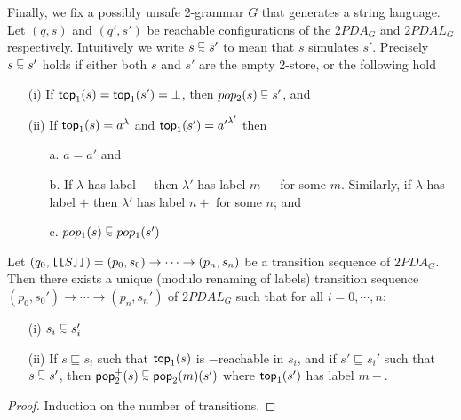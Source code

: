 Finally, we fix a possibly unsafe 2-grammar $G$ that generates a
string language. Let $(q, s)$ and $(q', s')$ be reachable
configurations of the $2PDA_G$ and $2PDAL_G$ respectively.
Intuitively we write $s \bohm s'$ to mean that $s$ simulates $s'$.
Precisely $s \bohm s'$ holds if either both $s$ and $s'$ are the
empty 2-store, or the following hold
\begin{itemize}
\item[(i)] If ${\sf top}_1(s) = {\sf top}_1(s') = \bot$, then $pop_2(s)
\bohm s'$, and
\item[(ii)] If ${\sf top}_1(s) = {a}^{\lambda}$ and ${\sf top}_1(s') =
{a'}^{\lambda'}$ then 
\begin{itemize}
\item[a.] $a = a'$ and
\item[b.] If $\lambda$ has label $-$ then $\lambda'$ has label $m-$
for some $m$. Similarly, if $\lambda$ has label $+$ then $\lambda'$
has label $n+$ for some $n$; and


\item[c.] $pop_1(s) \bohm pop_1(s')$
\end{itemize}
\end{itemize}

\begin{lemma}\label{lem:consistency}
Let $(q_0, \hbox{\tt [}{\hbox{\tt [}{S}\hbox{\tt ]}}\hbox{\tt ]}) = (p_0, s_0) \rightarrow \cdots
\rightarrow (p_n, s_n)$ be a transition sequence of $2PDA_G$. Then
there exists a unique (modulo renaming of labels) transition
sequence $(p_0, s_0') \rightarrow \cdots \rightarrow (p_n, s_n')$
of $2PDAL_G$ such that for all $i = 0, \cdots, n$:
\begin{itemize}
\item[(i)] $s_i \bohm s_i'$
\item[(ii)] If $s \sqsubseteq s_i$ such that ${\sf top}_1(s)$ is
$-$reachable in $s_i$, and if $s' \sqsubseteq s_i'$ such that $s \bohm
s'$, then $\pop^+_2(s) \bohm \pop_2(m)(s')$ where ${\sf top}_1(s')$ has
label $m-$.
\end{itemize}
\end{lemma}

\begin{proof}
Induction on the number of transitions.
\end{proof}

